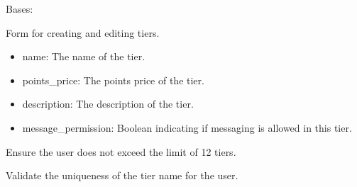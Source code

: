 \documentclass[letterpaper,10pt,english]{sphinxmanual}
\begin{document}
\begin{fulllineitems}
\label{\detokenize{modules/forms:creator.forms.TierForm}}
\pysigstartsignatures
{}
\pysigstopsignatures
\sphinxAtStartPar
Bases: 

\sphinxAtStartPar
Form for creating and editing tiers.
\begin{description}
\begin{itemize}
\item {} 
\sphinxAtStartPar
name: The name of the tier.

\item {} 
\sphinxAtStartPar
points\_price: The points price of the tier.

\item {} 
\sphinxAtStartPar
description: The description of the tier.

\item {} 
\sphinxAtStartPar
message\_permission: Boolean indicating if messaging is allowed in this tier.

\end{itemize}

\end{description}

\begin{fulllineitems}
\label{\detokenize{modules/forms:creator.forms.TierForm.clean}}
\pysigstartsignatures
{}
\pysigstopsignatures
\sphinxAtStartPar
Ensure the user does not exceed the limit of 12 tiers.

\end{fulllineitems}


\begin{fulllineitems}
\label{\detokenize{modules/forms:creator.forms.TierForm.clean_name}}
\pysigstartsignatures
{}
\pysigstopsignatures
\sphinxAtStartPar
Validate the uniqueness of the tier name for the user.


\end{fulllineitems}
\end{fulllineitems}
\end{document}
